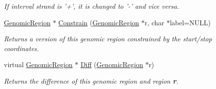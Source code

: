 \begin{DoxyCompactItemize}
\begin{DoxyCompactList}\small\item\em If interval strand is '+', it is changed to '-\/' and vice versa. \end{DoxyCompactList}\item 
\hypertarget{classGenomicRegion_a50f5ba99404da1cdae6a8632a19ff837}{
\hyperlink{classGenomicRegion}{GenomicRegion} $\ast$ \hyperlink{classGenomicRegion_a50f5ba99404da1cdae6a8632a19ff837}{Constrain} (\hyperlink{classGenomicRegion}{GenomicRegion} $\ast$r, char $\ast$label=NULL)}
\label{classGenomicRegion_a50f5ba99404da1cdae6a8632a19ff837}

\begin{DoxyCompactList}\small\item\em Returns a version of this genomic region constrained by the start/stop coordinates. \end{DoxyCompactList}\item 
\hypertarget{classGenomicRegion_a44cf789afda4e77749019045050e5ec7}{
virtual \hyperlink{classGenomicRegion}{GenomicRegion} $\ast$ \hyperlink{classGenomicRegion_a44cf789afda4e77749019045050e5ec7}{Diff} (\hyperlink{classGenomicRegion}{GenomicRegion} $\ast$r)}
\label{classGenomicRegion_a44cf789afda4e77749019045050e5ec7}

\begin{DoxyCompactList}\small\item\em Returns the difference of this genomic region and region {\bfseries r}. \end{DoxyCompactList}\end{DoxyCompactItemize}
